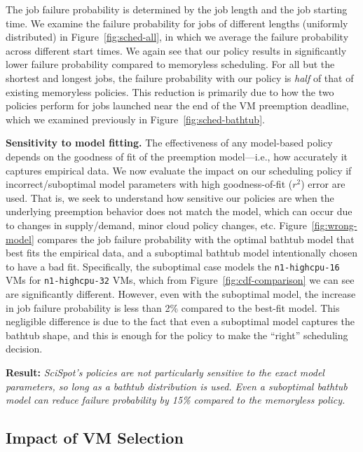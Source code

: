 \documentclass[compsoc]{IEEEtran}
\newcommand{\sysname}{SciSpot\xspace}
\begin{document}
The job failure probability is determined by the job length and the job starting time.
We examine the failure probability for jobs of different lengths (uniformly distributed) in Figure~\ref{fig:sched-all}, in which we average the failure probability across different start times.
We again see that our policy results in significantly lower failure probability compared to memoryless scheduling.
For all but the shortest and longest jobs, the failure probability with our policy is \emph{half} of that of existing memoryless policies. 
This reduction is primarily due to how the two policies perform for jobs launched near the end of the VM preemption deadline, which we examined previously in Figure~\ref{fig:sched-bathtub}. 




\noindent \textbf{Sensitivity to model fitting.}
The effectiveness of any model-based policy depends on the goodness of fit of the preemption model---i.e., how accurately it captures empirical data. 
We now evaluate the impact on our scheduling policy if incorrect/suboptimal model parameters with high goodness-of-fit ($r^2$) error are used. 
That is, we seek to understand how sensitive our policies are when the underlying preemption behavior does not match the model, which can occur due to changes in supply/demand, minor cloud policy changes, etc. 
Figure~\ref{fig:wrong-model} compares the job failure probability with the optimal bathtub model that best fits the empirical data, and a suboptimal  bathtub model intentionally chosen to have a bad fit. 
Specifically, the suboptimal case models the \texttt{n1-highcpu-16} VMs for \texttt{n1-highcpu-32} VMs, which from Figure~\ref{fig:cdf-comparison} we can see are significantly different.
However, even with the suboptimal model, the increase in job failure probability is less than 2\% compared to the best-fit model. 
This negligible difference is due to the fact that even a suboptimal model captures the bathtub shape, and this is enough for the policy to make the ``right'' scheduling decision. 

\noindent \textbf{Result:} \emph{\sysname's policies are not particularly sensitive to the exact model parameters, so long as a bathtub distribution is used. Even a suboptimal bathtub model can reduce failure probability by 15\% compared to the memoryless policy.} 


    



\subsection{Impact of VM Selection}
\end{document}
